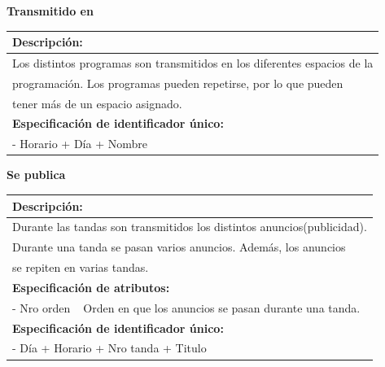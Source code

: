 \documentclass[a4paper,10pt]{article}
\begin{document}
    \begin{flushleft}
      \begin{large} \bf{Transmitido en} \end{large}
    \end{flushleft}
      \begin{tabular}{| p{2cm} | p{9cm} |}
	\hline
	\multicolumn{2}{|l|}{\bf{Descripci\'on:}} \\
	\hline
	\multicolumn{2}{|l|}{Los distintos programas son transmitidos en los diferentes espacios de la } \\
	\multicolumn{2}{|l|}{programaci\'on. Los programas pueden repetirse, por lo que pueden } \\	
	\multicolumn{2}{|l|}{tener m\'as de un espacio asignado.} \\	
	\hline	
	\multicolumn{2}{|l|}{\bf{Especificaci\'on de identificador \'unico:}} \\
	\hline
	\multicolumn{2}{|l|}{- Horario + D\'ia + Nombre} \\
	\hline
      \end{tabular}
       
    \begin{flushleft}
      \begin{large} \bf{Se publica} \end{large}
    \end{flushleft}
      \begin{tabular}{| p{2cm} | p{9cm} |}
	\hline
	\multicolumn{2}{|l|}{\bf{Descripci\'on:}} \\
	\hline
	\multicolumn{2}{|l|}{Durante las tandas son transmitidos los distintos anuncios(publicidad).} \\
	\multicolumn{2}{|l|}{Durante una tanda se pasan varios anuncios. Adem\'as, los anuncios } \\	
	\multicolumn{2}{|l|}{se repiten en varias tandas.} \\
	\hline
	\multicolumn{2}{|l|}{\bf{Especificaci\'on de atributos:}} \\
	\hline
	- Nro orden & Orden en que los anuncios se pasan durante una tanda. \\
	\hline
	\multicolumn{2}{|l|}{\bf{Especificaci\'on de identificador \'unico:}} \\
	\hline
	\multicolumn{2}{|l|}{- D\'ia + Horario + Nro tanda + Titulo} \\
	\hline
      \end{tabular}
\end{document}
